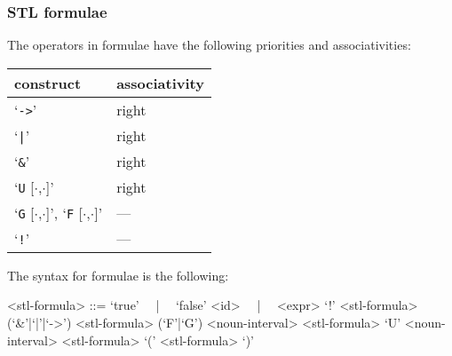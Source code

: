 \documentclass[10pt,a4paper]{article}
\begin{document}
\subsubsection{STL formulae}

The operators in formulae have the following priorities and associativities:
\begin{table}[ht]
	\centering
    \begin{tabular}{|l|l|} \hline
		construct & associativity \\
		\hline
		`\texttt{->}' & right \\
		`\texttt{|}' & right \\
		`\texttt{\&}' & right \\
		`\texttt{U} [$\cdot$,$\cdot$]' & right \\
		`\texttt{G} [$\cdot$,$\cdot$]', `\texttt{F} [$\cdot$,$\cdot$]' & --- \\
		`\texttt{!}' & --- \\
		\hline
	\end{tabular}
\end{table}

The syntax for formulae is the following:
\begin{grammar}
<stl-formula> ::= `true' ~~|~~ `false'
\alt <id> ~~|~~ <expr>
\alt `!' <stl-formula>
 (`&'|`|'|`->') <stl-formula>
\alt (`F'|`G') <noun-interval> <stl-formula>
 `U' <noun-interval> <stl-formula>
\alt `(' <stl-formula> `)'
\end{grammar}
\end{document}
